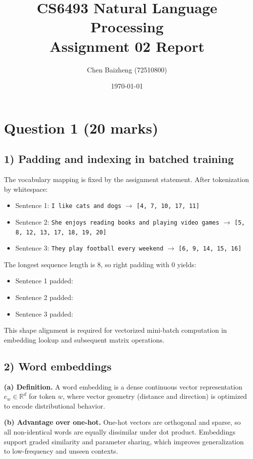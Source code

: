 \documentclass[12pt]{article}
\title{CS6493 Natural Language Processing\\Assignment 02 Report}
\author{Chen Baizheng (72510800)}
\date{\today}
\begin{document}
\maketitle

\section*{Question 1 (20 marks)}

\subsection*{1) Padding and indexing in batched training}
The vocabulary mapping is fixed by the assignment statement. After tokenization by whitespace:
\begin{itemize}[leftmargin=1.2em]
    \item Sentence 1: \texttt{I like cats and dogs} $\rightarrow$ \texttt{[4, 7, 10, 17, 11]}
    \item Sentence 2: \texttt{She enjoys reading books and playing video games} $\rightarrow$ \texttt{[5, 8, 12, 13, 17, 18, 19, 20]}
    \item Sentence 3: \texttt{They play football every weekend} $\rightarrow$ \texttt{[6, 9, 14, 15, 16]}
\end{itemize}

The longest sequence length is 8, so right padding with 0 yields:
\begin{itemize}[leftmargin=1.2em]
    \item Sentence 1 padded: \texttt{\QOneSentenceOneIndices}
    \item Sentence 2 padded: \texttt{\QOneSentenceTwoIndices}
    \item Sentence 3 padded: \texttt{\QOneSentenceThreeIndices}
\end{itemize}

This shape alignment is required for vectorized mini-batch computation in embedding lookup and subsequent matrix operations.

\subsection*{2) Word embeddings}
\textbf{(a) Definition.}
A word embedding is a dense continuous vector representation $e_w \in \mathbb{R}^d$ for token $w$, where vector geometry (distance and direction) is optimized to encode distributional behavior.

\textbf{(b) Advantage over one-hot.}
One-hot vectors are orthogonal and sparse, so all non-identical words are equally dissimilar under dot product. Embeddings support graded similarity and parameter sharing, which improves generalization to low-frequency and unseen contexts.
\end{document}
